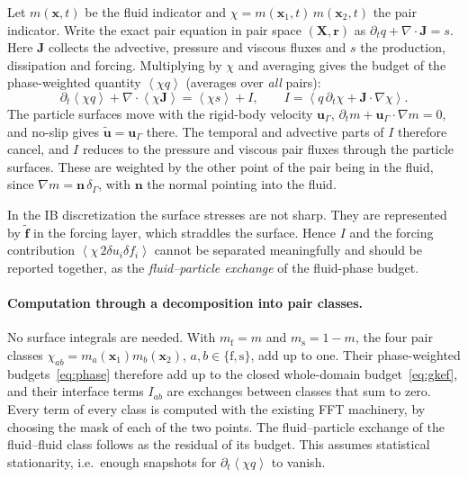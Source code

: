 \documentclass[11pt,a4paper]{article}
\newcommand{\avg}[1]{\left\langle #1 \right\rangle}
\newcommand{\du}{\delta u}
\newcommand{\vect}[1]{\boldsymbol{#1}}
\begin{document}
Let $m(\vect x,t)$ be the fluid indicator and
$\chi=m(\vect x_1,t)\,m(\vect x_2,t)$ the pair indicator. Write the exact pair
equation in pair space $(\vect X,\vect r)$ as
$\partial_tq+\nabla\cdot\vect J=s$. Here $\vect J$ collects the advective,
pressure and viscous fluxes and $s$ the production, dissipation and forcing.
Multiplying by $\chi$ and averaging gives the budget of the phase-weighted
quantity $\avg{\chi q}$ (averages over \emph{all} pairs):
\begin{equation}
  \partial_t\avg{\chi q}+\nabla\cdot\avg{\chi\vect J}=\avg{\chi s}+I,\qquad
  I=\avg{q\,\partial_t\chi+\vect J\cdot\nabla\chi}.
  \label{eq:phase}
\end{equation}
The particle surfaces move with the rigid-body velocity $\vect u_\Gamma$,
$\partial_tm+\vect u_\Gamma\cdot\nabla m=0$, and no-slip gives
$\tilde{\vect u}=\vect u_\Gamma$ there. The temporal and advective parts of $I$
therefore cancel, and $I$ reduces to the pressure and viscous pair fluxes
through the particle surfaces. These are weighted by the other point of the
pair being in the fluid, since $\nabla m=\vect n\,\delta_\Gamma$, with
$\vect n$ the normal pointing into the fluid.

In the IB discretization the surface stresses are not sharp. They are
represented by $\tilde{\vect f}$ in the forcing layer, which straddles the
surface. Hence $I$ and the forcing contribution $\avg{\chi\,2\du_i\delta f_i}$
cannot be separated meaningfully and should be reported together, as the
\emph{fluid--particle exchange} of the fluid-phase budget.

\paragraph{Computation through a decomposition into pair classes.} No surface
integrals are needed. With $m_\mathrm{f}=m$ and $m_\mathrm{s}=1-m$, the four
pair classes
$\chi_{ab}=m_a(\vect x_1)m_b(\vect x_2)$, $a,b\in\{\mathrm{f},\mathrm{s}\}$,
add up to one. Their phase-weighted budgets~\eqref{eq:phase} therefore add up
to the closed whole-domain budget~\eqref{eq:gkef}, and their interface terms
$I_{ab}$ are exchanges between classes that sum to zero. Every term of every
class is computed with the existing FFT machinery, by choosing the mask of
each of the two points. The fluid--particle exchange of the fluid--fluid
class follows as the residual of its budget. This assumes statistical
stationarity, i.e.\ enough snapshots for $\partial_t\avg{\chi q}$ to vanish.
\end{document}

